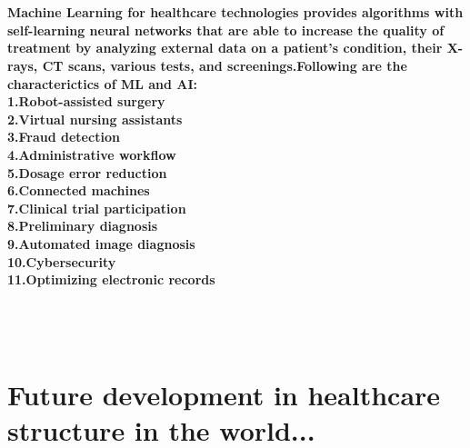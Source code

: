 \documentclass[12pt]{article}
\begin{document}
    \\\paragraph{Machine Learning for healthcare technologies provides algorithms with self-learning neural networks that are able to increase the quality of treatment by analyzing external data on a patient’s condition, their X-rays, CT scans, various tests, and screenings.Following are the characterictics of ML and AI:
    \\\textbf{1.}Robot-assisted surgery
    \\\textbf{2.}Virtual nursing assistants
    \\\textbf{3.}Fraud detection
    \\\textbf{4.}Administrative workflow
    \\\textbf{5.}Dosage error reduction
    \\\textbf{6.}Connected machines
    \\\textbf{7.}Clinical trial participation
    \\\textbf{8.}Preliminary diagnosis
    \\\textbf{9.}Automated image diagnosis
    \\\textbf{10.}Cybersecurity
    \\\textbf{11.}Optimizing electronic records}
    \\\\\section{Future development in healthcare structure in the world...}
\end{document}
